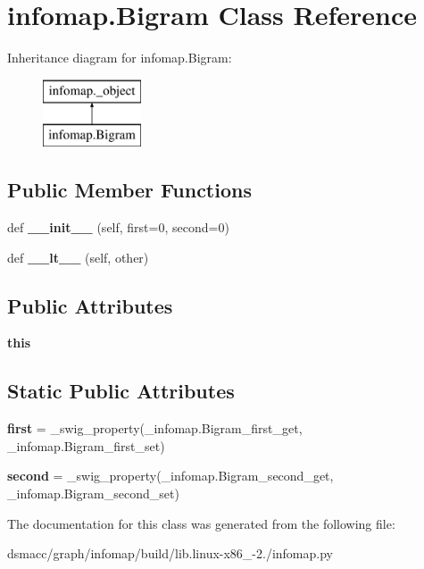 \hypertarget{classinfomap_1_1Bigram}{}\section{infomap.\+Bigram Class Reference}
\label{classinfomap_1_1Bigram}
Inheritance diagram for infomap.\+Bigram\+:\begin{figure}[H]
\begin{center}
\leavevmode
\includegraphics[height=2.000000cm]{classinfomap_1_1Bigram}
\end{center}
\end{figure}
\subsection*{Public Member Functions}
\begin{DoxyCompactItemize}
\item 
\mbox{\label{classinfomap_1_1Bigram_a4d23aca42e446abca1a1ee39369ecfc4}} 
def {\bfseries \+\_\+\+\_\+init\+\_\+\+\_\+} (self, first=0, second=0)
\item 
\mbox{\label{classinfomap_1_1Bigram_abab5510987ddbb3ec08b1fc19dfe508d}} 
def {\bfseries \+\_\+\+\_\+lt\+\_\+\+\_\+} (self, other)
\end{DoxyCompactItemize}
\subsection*{Public Attributes}
\begin{DoxyCompactItemize}
\item 
\mbox{\label{classinfomap_1_1Bigram_a2bd753134b4f000c43e010128c0e525f}} 
{\bfseries this}
\end{DoxyCompactItemize}
\subsection*{Static Public Attributes}
\begin{DoxyCompactItemize}
\item 
\mbox{\label{classinfomap_1_1Bigram_a8d7ab17126431dce23f3558a06bddbc0}} 
{\bfseries first} = \+\_\+swig\+\_\+property(\+\_\+infomap.\+Bigram\+\_\+first\+\_\+get, \+\_\+infomap.\+Bigram\+\_\+first\+\_\+set)
\item 
\mbox{\label{classinfomap_1_1Bigram_a62e9e31f28b689c74f9b0c6ffc276c5f}} 
{\bfseries second} = \+\_\+swig\+\_\+property(\+\_\+infomap.\+Bigram\+\_\+second\+\_\+get, \+\_\+infomap.\+Bigram\+\_\+second\+\_\+set)
\end{DoxyCompactItemize}


The documentation for this class was generated from the following file\+:\begin{DoxyCompactItemize}
\item 
dsmacc/graph/infomap/build/lib.\+linux-\/x86\+\_-\/2./infomap.\+py\end{DoxyCompactItemize}
